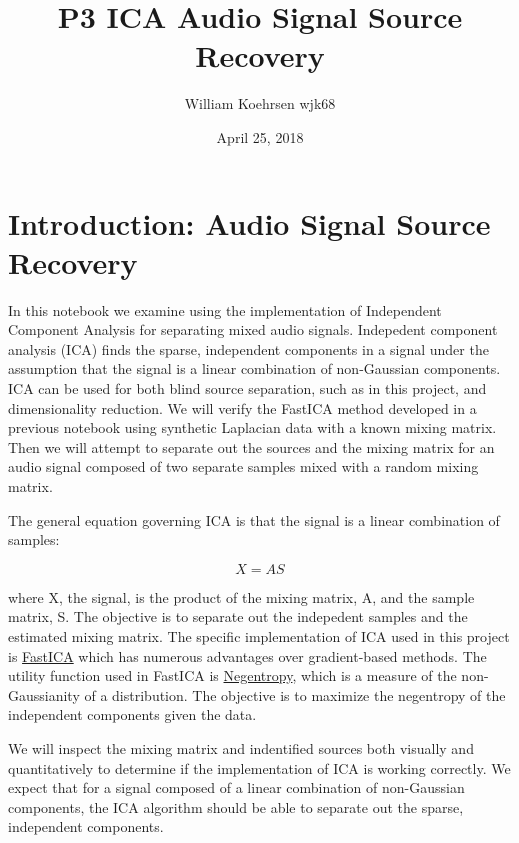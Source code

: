 \documentclass[12pt]{article}
\title{P3 ICA Audio Signal Source Recovery}
\author{William Koehrsen wjk68}
\date{April 25, 2018}
\begin{document}
    
    
    \maketitle
    \tableofcontents
    
    

    
    \hypertarget{introduction}{%
\section{Introduction: Audio Signal Source Recovery}\label{introduction}}

In this notebook we examine using the implementation of Independent
Component Analysis for separating mixed audio signals. Indepedent
component analysis (ICA) finds the sparse, independent components in a
signal under the assumption that the signal is a linear combination of
non-Gaussian components. ICA can be used for both blind source
separation, such as in this project, and dimensionality reduction. We
will verify the FastICA method developed in a previous notebook using
synthetic Laplacian data with a known mixing matrix. Then we will
attempt to separate out the sources and the mixing matrix for an audio
signal composed of two separate samples mixed with a random mixing
matrix.

The general equation governing ICA is that the signal is a linear
combination of samples:

\[X = AS\]

where X, the signal, is the product of the mixing matrix, A, and the
sample matrix, S. The objective is to separate out the indepedent
samples and the estimated mixing matrix. The specific implementation of
ICA used in this project is
\href{https://www.cs.helsinki.fi/u/ahyvarin/papers/TNN99new.pdf}{FastICA}
which has numerous advantages over gradient-based methods. The utility
function used in FastICA is
\href{https://www.cs.helsinki.fi/u/ahyvarin/papers/TR_A47_apprent.pdf}{Negentropy},
which is a measure of the non-Gaussianity of a distribution. The
objective is to maximize the negentropy of the independent components
given the data.

We will inspect the mixing matrix and indentified sources both visually
and quantitatively to determine if the implementation of ICA is working
correctly. We expect that for a signal composed of a linear combination
of non-Gaussian components, the ICA algorithm should be able to separate
out the sparse, independent components.
\end{document}
